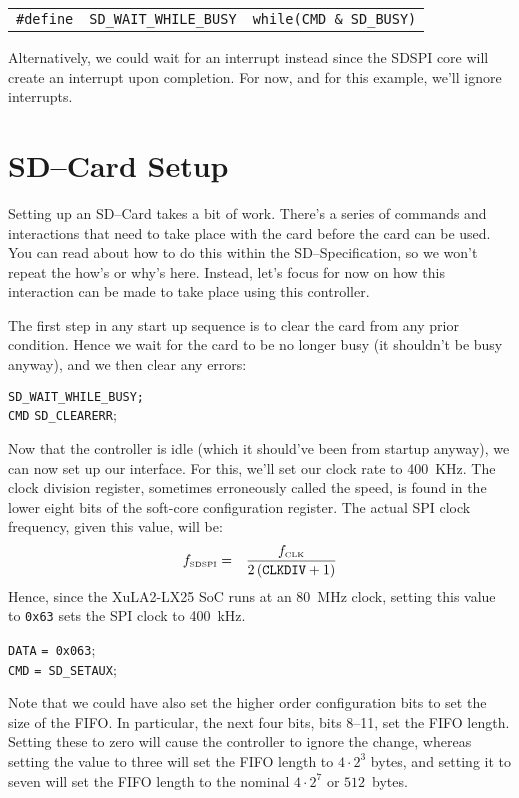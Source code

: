 \documentclass{gqtekspec}
\begin{document}
\begin{tabular}{lll}
{\tt \#define} & {\tt SD\_WAIT\_WHILE\_BUSY}&{\tt while(CMD \& SD\_BUSY)}
\end{tabular}

Alternatively, we could wait for an interrupt instead since the SDSPI core
will create an interrupt upon completion.  For now, and for this example,
we'll ignore interrupts.

\section{SD--Card Setup}
Setting up an SD--Card takes a bit of work.  There's a series of commands 
and interactions that need to take place with the card before the card can
be used.  You can read about how to do this within the SD--Specification, so
we won't repeat the how's or why's here.  Instead, let's focus for now on 
how this interaction can be made to take place using this controller.

The first step in any start up sequence is to clear the card from any
prior condition.  Hence we wait for the card to be no longer busy (it 
shouldn't be busy anyway), and we then clear any errors:
\begin{tabbing}
{\tt SD\_WAIT\_WHILE\_BUSY;} \\
{\tt CMD} \= {\tt SD\_CLEARERR};
\end{tabbing}

Now that the controller is idle (which it should've been from startup anyway),
we can now set up our interface.  For this, we'll set our clock rate to 400~KHz.
The clock division register, sometimes erroneously called the speed, is found
in the lower eight bits of the soft-core configuration register.  The actual
SPI clock frequency, given this value, will be:
\begin{eqnarray}
f_{\mbox{\tiny SDSPI}} &=& \frac{f_{\mbox{\tiny CLK}}}{2\left(\mbox{\tt CLKDIV}+1\right)}
\end{eqnarray}
Hence, since the XuLA2-LX25 SoC runs at an 80~MHz clock, setting this value to
{\tt 0x63} sets the SPI clock to 400~kHz.
\begin{tabbing}
{\tt DATA} \= {\tt = 0x063}; \\
{\tt CMD} \> {\tt = SD\_SETAUX};
\end{tabbing}
Note that we could have also set the higher order configuration bits to set
the size of the FIFO.  In particular, the next four bits, bits 8--11, set
the FIFO length.  Setting these to zero will cause the controller to ignore
the change, whereas setting the value to three will set the FIFO length to
$4\cdot2^3$ bytes, and setting it to seven will set the FIFO length to the
nominal $4\cdot 2^7$ or $512$~bytes.
\end{document}
